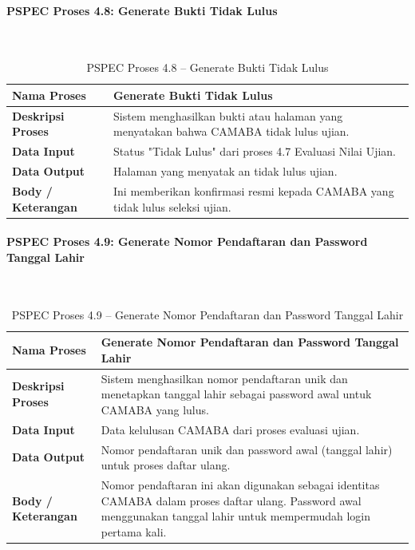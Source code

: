 \paragraph{PSPEC Proses 4.8: Generate Bukti Tidak Lulus}~\\
\begin{longtable}{|p{}|p{}|}
	\caption{PSPEC Proses 4.8 -- Generate Bukti Tidak Lulus}
	\label{table:3.pspec48}\\
	\hline
	\textbf{Nama Proses} & Generate Bukti Tidak Lulus \\
	\hline
	\textbf{Deskripsi Proses} & Sistem menghasilkan bukti atau halaman yang menyatakan bahwa CAMABA tidak lulus ujian. \\
	\hline
	\textbf{Data Input} & Status "Tidak Lulus" dari proses 4.7 Evaluasi Nilai Ujian. \\
	\hline
	\textbf{Data Output} & Halaman yang menyatak an tidak lulus ujian. \\
	\hline
	\textbf{Body / Keterangan} & Ini memberikan konfirmasi resmi kepada CAMABA yang tidak lulus seleksi ujian. \\
	\hline
\end{longtable}

\paragraph{PSPEC Proses 4.9: Generate Nomor Pendaftaran dan Password Tanggal Lahir}~\\
\begin{longtable}{|p{}|p{}|}
	\caption{PSPEC Proses 4.9 -- Generate Nomor Pendaftaran dan Password Tanggal Lahir}
	\label{table:3.pspec49}\\
	\hline
	\textbf{Nama Proses} & Generate Nomor Pendaftaran dan Password Tanggal Lahir \\
	\hline
	\textbf{Deskripsi Proses} & Sistem menghasilkan nomor pendaftaran unik dan menetapkan tanggal lahir sebagai password awal untuk CAMABA yang lulus. \\
	\hline
	\textbf{Data Input} & Data kelulusan CAMABA dari proses evaluasi ujian. \\
	\hline
	\textbf{Data Output} & Nomor pendaftaran unik dan password awal (tanggal lahir) untuk proses daftar ulang. \\
	\hline
	\textbf{Body / Keterangan} & Nomor pendaftaran ini akan digunakan sebagai identitas CAMABA dalam proses daftar ulang. Password awal menggunakan tanggal lahir untuk mempermudah login pertama kali. \\
	\hline
\end{longtable}

